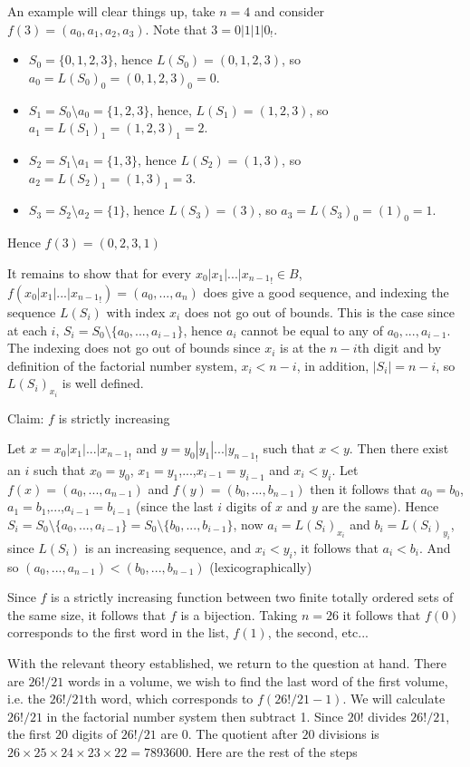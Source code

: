 \documentclass[11pt]{article}
\begin{document}
An example will clear things up, take $n=4$ and consider $f(3)=(a_0,a_1,a_2,a_3)$. Note that
$3=0|1|1|0_!$.
\begin{itemize}
	\item $S_0=\{0,1,2,3\}$, hence $L(S_0)=(0,1,2,3)$, so $a_0=L(S_0)_0=(0,1,2,3)_0=0$.
	\item $S_1=S_0\setminus{a_0}=\{1,2,3\}$, hence, $L(S_1)=(1,2,3)$, so $a_1=L(S_1)_1=(1,2,3)_1=2$.
	\item $S_2=S_1\setminus{a_1}=\{1,3\}$, hence $L(S_2)=(1,3)$, so $a_2=L(S_2)_1=(1,3)_1=3$.
	\item $S_3=S_2\setminus{a_2}=\{1\}$, hence $L(S_3)=(3)$, so $a_3=L(S_3)_0=(1)_0=1$.
\end{itemize}
Hence $f(3)=(0,2,3,1)$

It remains to show that for every $x_0|x_1|...|{x_{n-1}}_!\in B$, $f(x_0|x_1|...|{x_{n-1}}_!)=(a_0,...,a_n)$ does give a good sequence, and indexing the sequence $L(S_i)$ with index $x_i$ does not go out of bounds. This is the case since at each $i$, $S_i=S_0\setminus\{a_0,...,a_{i-1}\}$, hence $a_i$ cannot be equal to any of $a_0,...,a_{i-1}$. The indexing does not go out of bounds since $x_i$ is at the $n-i$th digit and by definition of the factorial number system, $x_i<n-i$, in addition, $|S_i|=n-i$, so $L(S_i)_{x_i}$ is well defined.

Claim: $f$ is strictly increasing

Let $x=x_0|x_1|...|{x_{n-1}}_!$ and $y=y_0|y_1|...|{y_{n-1}}_!$ such that $x<y$. Then there exist an $i$ such that $x_0=y_0$, $x_1=y_1$,...,$x_{i-1}=y_{i-1}$ and $x_i<y_i$. Let $f(x)=(a_0,...,a_{n-1})$ and $f(y)=(b_0,...,b_{n-1})$ then it follows that $a_0=b_0$, $a_1=b_1$,...,$a_{i-1}=b_{i-1}$ (since the last $i$ digits of $x$ and $y$ are the same). Hence $S_i=S_0\setminus\{a_0,...,a_{i-1}\}=S_0\setminus\{b_0,...,b_{i-1}\}$, now $a_i=L(S_i)_{x_i}$ and $b_i=L(S_i)_{y_i}$, since $L(S_i)$ is an increasing sequence, and $x_i<y_i$, it follows that $a_i<b_i$. And so $(a_0,...,a_{n-1})<(b_0,...,b_{n-1})$ (lexicographically)

Since $f$ is a strictly increasing function between two finite totally ordered sets of the same size, it follows that $f$ is a bijection. Taking $n=26$ it follows that $f(0)$ corresponds to the first word in the list, $f(1)$, the second, etc...

With the relevant theory established, we return to the question at hand. There are $26!/21$ words in a volume, we wish to find the last word of the first volume, i.e. the $26!/21$th word, which corresponds to $f(26!/21-1)$. We will calculate $26!/21$ in the factorial number system then subtract 1. Since $20!$ divides $26!/21$, the first $20$ digits of $26!/21$ are $0$. The quotient after $20$ divisions is $26\times25\times24\times23\times22=7893600$. Here are the rest of the steps
\end{document}
